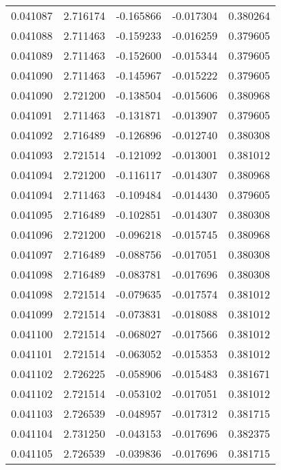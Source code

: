 \begin{tabular}{lrrrr}
0.041087    &  2.716174 & -0.165866 & -0.017304 &             0.380264 \\
0.041088    &  2.711463 & -0.159233 & -0.016259 &             0.379605 \\
0.041089    &  2.711463 & -0.152600 & -0.015344 &             0.379605 \\
0.041090    &  2.711463 & -0.145967 & -0.015222 &             0.379605 \\
0.041090    &  2.721200 & -0.138504 & -0.015606 &             0.380968 \\
0.041091    &  2.711463 & -0.131871 & -0.013907 &             0.379605 \\
0.041092    &  2.716489 & -0.126896 & -0.012740 &             0.380308 \\
0.041093    &  2.721514 & -0.121092 & -0.013001 &             0.381012 \\
0.041094    &  2.721200 & -0.116117 & -0.014307 &             0.380968 \\
0.041094    &  2.711463 & -0.109484 & -0.014430 &             0.379605 \\
0.041095    &  2.716489 & -0.102851 & -0.014307 &             0.380308 \\
0.041096    &  2.721200 & -0.096218 & -0.015745 &             0.380968 \\
0.041097    &  2.716489 & -0.088756 & -0.017051 &             0.380308 \\
0.041098    &  2.716489 & -0.083781 & -0.017696 &             0.380308 \\
0.041098    &  2.721514 & -0.079635 & -0.017574 &             0.381012 \\
0.041099    &  2.721514 & -0.073831 & -0.018088 &             0.381012 \\
0.041100    &  2.721514 & -0.068027 & -0.017566 &             0.381012 \\
0.041101    &  2.721514 & -0.063052 & -0.015353 &             0.381012 \\
0.041102    &  2.726225 & -0.058906 & -0.015483 &             0.381671 \\
0.041102    &  2.721514 & -0.053102 & -0.017051 &             0.381012 \\
0.041103    &  2.726539 & -0.048957 & -0.017312 &             0.381715 \\
0.041104    &  2.731250 & -0.043153 & -0.017696 &             0.382375 \\
0.041105    &  2.726539 & -0.039836 & -0.017696 &             0.381715 \\

\end{tabular}
